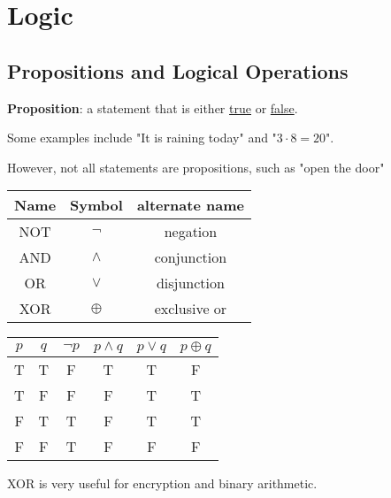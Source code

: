 \section{Logic}
\subsection{Propositions and Logical Operations}

\textbf{Proposition}: a statement that is either \underline{true} or \underline{false}.


Some examples include "It is raining today" and "\(3 \cdot 8 = 20 \)".


However, not all statements are propositions, such as "open the door"

\begin{center}
  \begin{tabular}{c|c|c}
    \textbf{Name} & \textbf{Symbol} & \textbf{alternate name} \\
    \hline
    NOT           & $\lnot$         & negation                \\
    AND           & $\land$         & conjunction             \\
    OR            & $\lor$          & disjunction             \\
    XOR           & $\oplus$        & exclusive or            \\
  \end{tabular}
  \qquad
  \begin{tabular}{c|c|c|c|c|c}
    \textbf{$p$} & \textbf{$q$} & \textbf{$\lnot p$} & \textbf{$p \land q$} & \textbf{$p \lor q$} & \textbf{$p \oplus q$} \\
    \hline
    T            & T            & F                  & T                    & T                   & F                     \\
    T            & F            & F                  & F                    & T                   & T                     \\
    F            & T            & T                  & F                    & T                   & T                     \\
    F            & F            & T                  & F                    & F                   & F                     \\
  \end{tabular}
\end{center}

XOR is very useful for encryption and binary arithmetic.

